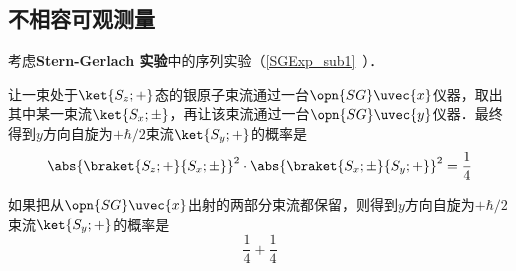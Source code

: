 \subsection{不相容可观测量}


考虑\textbf{Stern-Gerlach 实验}中的序列实验（\autoref{SGExp_sub1}~）．

让一束处于$\ket{S_z; +}$态的银原子束流通过一台$\opn{SG}\uvec{x}$仪器，取出其中某一束流$\ket{S_x; \pm}$，再让该束流通过一台$\opn{SG}\uvec{y}$仪器．最终得到$y$方向自旋为$+\hbar/2$束流$\ket{S_y; +}$的概率是
\begin{equation}
\abs{\braket{S_z; +}{S_x; \pm}}^2\cdot\abs{\braket{S_x; \pm}{S_y; +}}^2 = \frac{1}{4}
\end{equation}

如果把从$\opn{SG}\uvec{x}$出射的两部分束流都保留，则得到$y$方向自旋为$+\hbar/2$束流$\ket{S_y; +}$的概率是
\begin{equation}
\frac{1}{4}+\frac{1}{4}
\end{equation}

























